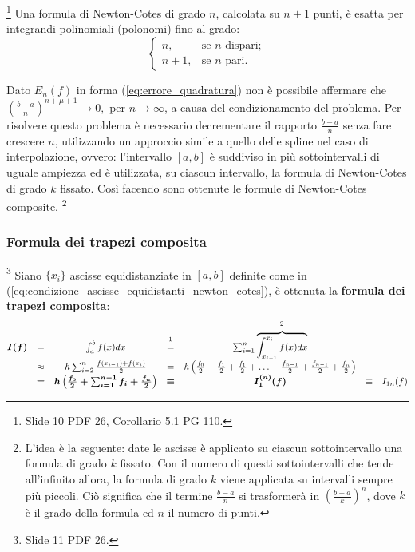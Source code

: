 \begin{remark}
    \footnote{Slide 10 PDF 26, Corollario 5.1 PG 110.} Una formula di Newton-Cotes di grado $n$, calcolata su $n+1$ punti, è esatta per integrandi polinomiali (polonomi) fino al grado:
    \begin{equation*}
        \begin{cases}
            n, &\text{se $n$ dispari};\\
            n+1, &\text{se $n$ pari}.
        \end{cases}
    \end{equation*}
\end{remark}

Dato $E_n(f)$ in forma (\ref{eq:errore_quadratura}) non è possibile affermare che $\left(\frac{b-a}{n}\right)^{n+\mu +1}\rightarrow 0,$ per $ n\rightarrow\infty$, a causa del condizionamento del problema. Per risolvere questo problema è necessario decrementare il rapporto $\frac{b-a}{n}$ senza fare crescere $n$, utilizzando un approccio simile a quello delle spline nel caso di interpolazione, ovvero: l'intervallo $[a,b]$ è suddiviso in più sottointervalli di uguale ampiezza ed è utilizzata, su ciascun intervallo, la formula di Newton-Cotes di grado $k$ fissato. Così facendo sono ottenute le formule di Newton-Cotes composite.
\footnote{L'idea è la seguente: date le ascisse è applicato su ciascun sottointervallo una formula di grado $k$ fissato. Con il numero di questi sottointervalli che tende all'infinito allora, la formula di grado $k$ viene applicata su intervalli sempre più piccoli. Ciò significa che il termine $\frac{b-a}{n}$ si trasformerà in $\left(\frac{b-a}{k}\right)^n$, dove $k$ è il grado della formula ed $n$ il numero di punti.}

\subsubsection{Formula dei trapezi composita}
\begin{definition}\footnote{Slide 11 PDF 26.}
    Siano $\{x_i\}$ ascisse equidistanziate in $[a,b]$ definite come in (\ref{eq:condizione_ascisse_equidistanti_newton_cotes}), è ottenuta la \textbf{formula dei trapezi composita}:
    \begin{equation}\label{eq:formTrapComp}
        \begin{matrix}
            \boldsymbol{I(f)}&=&\int_a^b f(x) dx &\overset{\footnotemark}{=}&\sum_{i=1}^n\overbrace{\int_{x_{i-1}}^{x_i} f(x)dx}^{\footnotemark}\\
            &\approx& h\sum_{i=2}^n\frac{f(x_{i-1})+f(x_i)}{2} &=& h\left(\frac{f_0}{2}+\frac{f_1}{2}+\frac{f_1}{2}+\hdots +\frac{f_{n-1}}{2}+\frac{f_{n-1}}{2}+\frac{f_n}{2}\right)\\
            &\boldsymbol =&\boldsymbol{h\left(\frac{f_0}{2}+\sum_{i=1}^{n-1}f_i+\frac{f_n}{2}\right)} &\boldsymbol\equiv& \boldsymbol{I_1^{(n)}(f)} &\equiv& I_{1n}(f)
        \end{matrix}
    \end{equation}
\end{definition}

